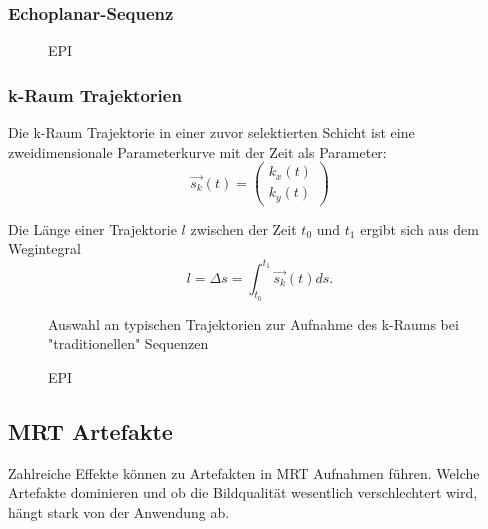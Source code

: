 \subsubsection{Echoplanar-Sequenz}

\begin{figure}[H]
	\centering
	\caption[Echoplanar Sequenz]{EPI}
	\label{fig:EPI}
\end{figure}

\subsubsection{k-Raum Trajektorien}
Die k-Raum Trajektorie in einer zuvor selektierten Schicht ist eine zweidimensionale Parameterkurve mit der Zeit als Parameter:
\begin{equation}
	\vec{s_k}(t)=\begin{pmatrix}k_x(t) \\ k_y(t)\end{pmatrix}
\end{equation}

Die Länge einer Trajektorie $l$ zwischen der Zeit $t_0$ und $t_1$ ergibt sich aus dem Wegintegral
\begin{equation}
	l=\Delta s = \int_{t_0}^{t_1} \vec{s_k}(t) ds.
\end{equation}

\begin{figure}[H]
	\centering
	\hfill
	\hfill
	\caption{Auswahl an typischen Trajektorien zur Aufnahme des k-Raums bei "traditionellen" Sequenzen}
\end{figure}

\begin{figure}[H]
	\centering
	\caption[Echoplanar Sequenz]{EPI}
	\label{fig:EPI}
\end{figure}





\subsection{MRT Artefakte}
Zahlreiche Effekte können zu Artefakten in MRT Aufnahmen führen. Welche Artefakte dominieren und ob die Bildqualität wesentlich verschlechtert wird, hängt stark von der Anwendung ab.

